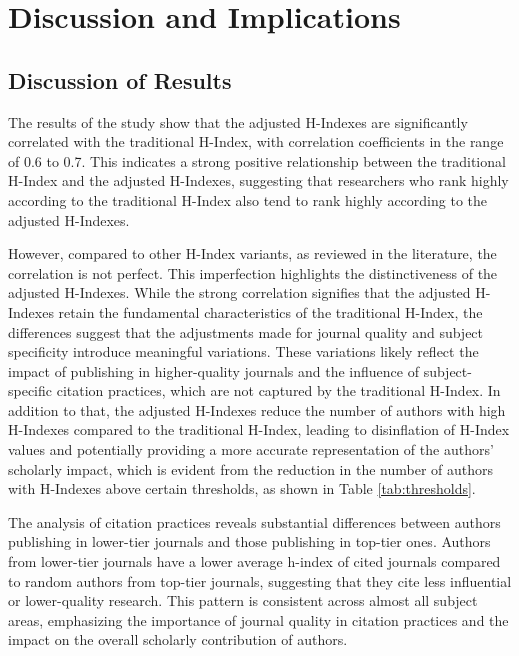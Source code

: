 \chapter{Discussion and Implications}
\label{ch:discussion}

\section{Discussion of Results}

The results of the study show that the adjusted H-Indexes are significantly
correlated with the traditional H-Index, with correlation coefficients in the
range of 0.6 to 0.7. This indicates a strong positive relationship between the
traditional H-Index and the adjusted H-Indexes, suggesting that researchers who
rank highly according to the traditional H-Index also tend to rank highly
according to the adjusted H-Indexes.

However, compared to other H-Index variants, as reviewed in the literature, the
correlation is not perfect. This imperfection highlights the distinctiveness of
the adjusted H-Indexes. While the strong correlation signifies that the
adjusted H-Indexes retain the fundamental characteristics of the traditional
H-Index, the differences suggest that the adjustments made for journal quality
and subject specificity introduce meaningful variations. These variations
likely reflect the impact of publishing in higher-quality journals and the
influence of subject-specific citation practices, which are not captured by the
traditional H-Index. In addition to that, the adjusted H-Indexes reduce the number
of authors with high H-Indexes
compared to the traditional H-Index, leading to disinflation of H-Index values
and potentially providing a more accurate representation of the authors'
scholarly impact, which is evident from the reduction in the number of authors
with H-Indexes above certain thresholds, as shown in Table
\ref{tab:thresholds}.  %

The analysis of citation practices reveals substantial differences between
authors publishing in lower-tier journals and those publishing in top-tier ones.
Authors from lower-tier journals have a lower average h-index of
cited journals compared to random authors from top-tier journals, suggesting
that they cite less influential or lower-quality research. This pattern is
consistent across almost all subject areas, emphasizing the importance of
journal quality in citation practices and the impact on the overall scholarly
contribution of authors.

